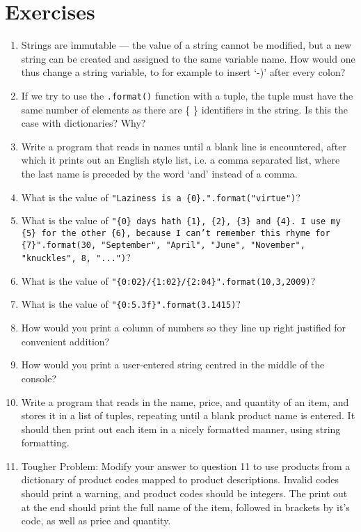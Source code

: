 \section{Exercises}
\begin{enumerate}
	\item Strings are immutable --- the value of a string                         cannot be modified, but a new string can be created and                         assigned to the same variable name.  How would one thus                         change a string variable, to for example to insert `-)'                         after every colon?
	\item If we try to use the \texttt{.format()} function with a                         tuple, the tuple must have the same number of elements                         as there are \{ \} identifiers in the string. Is this the                         case with dictionaries?  Why?
	\item Write a program that reads in names until a blank                         line is encountered, after which it prints out an                         English style list, i.e. a comma separated list, where                         the last name is preceded by the word `and' instead of                         a comma.
	\item What is the value of 
\texttt{"Laziness is a    \{0\}.".format("virtue")}?
	\item What is the value of 
\texttt{"\{0\} days hath \{1\}, \{2\}, \{3\} and \{4\}. I    use my \{5\} for the other \{6\}, because I can't remember this rhyme for    \{7\}".format(30, "September", "April", "June", "November", "knuckles", 8,    "...")}?
	\item What is the value of    
\texttt{"\{0:02\}/\{1:02\}/\{2:04\}".format(10,3,2009)}?
	\item What is the value of 
\texttt{"\{0:5.3f\}".format(3.1415)}?
	\item How would you print a column of numbers so they line up right    justified for convenient addition?
	\item How would you print a user-entered string centred in the    middle of the console?
	\item Write a program that reads in the name, price, and quantity of    an item, and stores it in a list of tuples, repeating until a blank    product name is entered. It should then print out each item in a    nicely formatted manner, using string formatting.
	\item Tougher Problem: Modify your answer to question 11                         to use products from a dictionary of product codes                         mapped to product descriptions. Invalid codes should                         print a warning, and product codes should be integers.                         The print out at the end should print the full name of                         the item, followed in brackets by it's code, as well as                         price and quantity.
\end{enumerate} 
